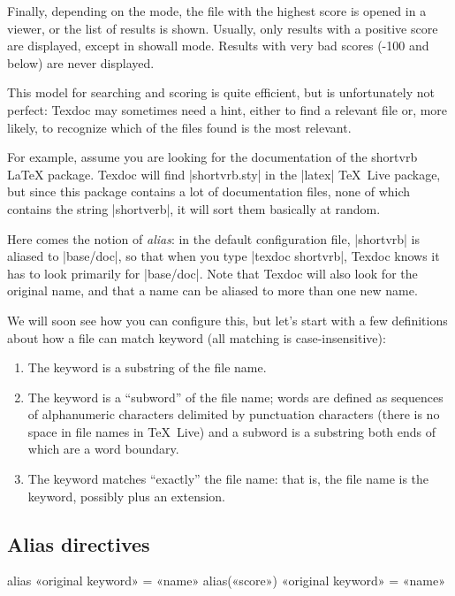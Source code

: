 \documentclass[a4paper, oneside]{scrartcl}
\makeatletter
\newcommand\texlive{\TeX~Live\xspace}
\newenvironment{htcode}{%
  \SaveVerbatim[samepage, gobble=2]{verbmat}%
  }{%
  \endSaveVerbatim
  \par\medskip\noindent\hspace*{\parindent}%
  \BUseVerbatim{verbmat}%
  \par\medskip\@endpetrue}
\makeatother
\begin{document}
Finally, depending on the mode, the file with the highest score is opened in a
viewer, or the list of results is shown. Usually, only results with a positive
score are displayed, except in showall mode. Results with very bad scores
(-100 and below) are never displayed.

\medskip

This model for searching and scoring is quite efficient, but is unfortunately
not perfect: Texdoc may sometimes need a hint, either to find a relevant file
or, more likely, to recognize which of the files found is the most relevant.

For example, assume you are looking for the documentation of the shortvrb
{\LaTeX} package. Texdoc will find |shortvrb.sty| in the |latex| \texlive
package, but since this package contains a lot of documentation files, none of
which contains the string |shortverb|, it will sort them basically at random.

Here comes the notion of \emph{alias}: in the default configuration file,
|shortvrb| is aliased to |base/doc|, so that when you type |texdoc shortvrb|,
Texdoc knows it has to look primarily for |base/doc|. Note that Texdoc will
also look for the original name, and that a name can be aliased to more than
one new name.

\medskip

We will soon see how you can configure this, but let's start with a few
definitions about how a file can match keyword (all matching is
case-insensitive):
\begin{enumerate}
  \item The keyword is a substring of the file name.
  \item The keyword is a ``subword'' of the file name; words are defined as
    sequences of alphanumeric characters delimited by punctuation characters
    (there is no space in file names in \texlive) and a subword is a
    substring both ends of which are a word boundary.
  \item The keyword matches ``exactly'' the file name: that is, the file
    name is the keyword, possibly plus an extension.
\end{enumerate}

\subsection{Alias directives}\label{ss-alias}

\begin{htcode}
  alias «original keyword» = «name»
  alias(«score») «original keyword» = «name»
\end{htcode}
\end{document}
